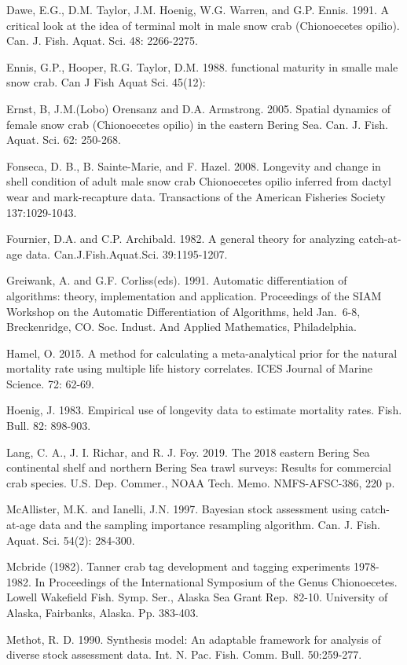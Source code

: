 \documentclass[
]{article}
\begin{document}
Dawe, E.G., D.M. Taylor, J.M. Hoenig, W.G. Warren, and G.P. Ennis. 1991. A critical look at the idea of terminal molt in male snow crab (Chionoecetes opilio). Can. J. Fish. Aquat. Sci. 48: 2266-2275.

Ennis, G.P., Hooper, R.G. Taylor, D.M. 1988. functional maturity in smalle male snow crab. Can J Fish Aquat Sci. 45(12):

Ernst, B, J.M.(Lobo) Orensanz and D.A. Armstrong. 2005. Spatial dynamics of female snow crab (Chionoecetes opilio) in the eastern Bering Sea. Can. J. Fish. Aquat. Sci. 62: 250-268.

Fonseca, D. B., B. Sainte-Marie, and F. Hazel. 2008. Longevity and change in shell condition of adult male snow crab Chionoecetes opilio inferred from dactyl wear and mark-recapture data. Transactions of the American Fisheries Society 137:1029-1043.

Fournier, D.A. and C.P. Archibald. 1982. A general theory for analyzing catch-at-age data. Can.J.Fish.Aquat.Sci. 39:1195-1207.

Greiwank, A. and G.F. Corliss(eds). 1991. Automatic differentiation of algorithms: theory, implementation and application. Proceedings of the SIAM Workshop on the Automatic Differentiation of Algorithms, held Jan.~6-8, Breckenridge, CO. Soc. Indust. And Applied Mathematics, Philadelphia.

Hamel, O. 2015. A method for calculating a meta-analytical prior for the natural mortality rate using multiple life history correlates. ICES Journal of Marine Science. 72: 62-69.

Hoenig, J. 1983. Empirical use of longevity data to estimate mortality rates. Fish. Bull. 82: 898-903.

Lang, C. A., J. I. Richar, and R. J. Foy. 2019. The 2018 eastern Bering Sea continental shelf and northern Bering Sea trawl surveys: Results for commercial crab species. U.S. Dep. Commer., NOAA Tech. Memo. NMFS-AFSC-386, 220 p.

McAllister, M.K. and Ianelli, J.N. 1997. Bayesian stock assessment using catch-at-age data and the sampling importance resampling algorithm. Can. J. Fish. Aquat. Sci. 54(2): 284-300.

Mcbride (1982). Tanner crab tag development and tagging experiments 1978-1982. In Proceedings of the International Symposium of the Genus Chionoecetes. Lowell Wakefield Fish. Symp. Ser., Alaska Sea Grant Rep.~82-10. University of Alaska, Fairbanks, Alaska. Pp. 383-403.

Methot, R. D. 1990. Synthesis model: An adaptable framework for analysis of diverse stock assessment data. Int. N. Pac. Fish. Comm. Bull. 50:259-277.
\end{document}
